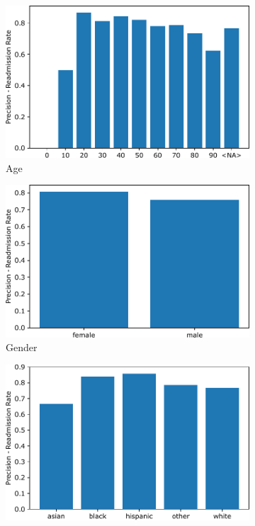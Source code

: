 \documentclass[a4paper,11pt]{article}
\begin{document}
\begin{figure}[htb]
\centering
\begin{subfigure}{0.49\textwidth}
    \includegraphics[width=\textwidth]{images/discrimination_requirement_age.pdf}
    \caption{Age}
    \label{fig:discrim_req_sensitive_age}
\end{subfigure}
\hfill
\begin{subfigure}{0.49\textwidth}
    \includegraphics[width=\textwidth]{images/discrimination_requirement_gender.pdf}
    \caption{Gender}
    \label{fig:discrim_req_sensitive_gender}
\end{subfigure}
\begin{subfigure}{0.49\textwidth}
    \includegraphics[width=\textwidth]{images/discrimination_requirement_race.pdf}

\end{subfigure}
\end{figure}
\end{document}
